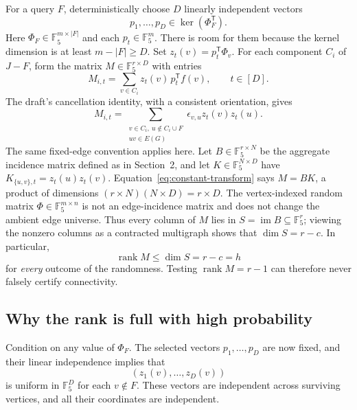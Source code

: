 \documentclass[11pt]{article}
\theoremstyle{remark}\newtheorem{remark}[theorem]{Remark}
\newcommand{\F}{\mathbb F}
\newcommand{\rank}{\operatorname{rank}}
\begin{document}
For a query $F$, deterministically choose $D$ linearly independent vectors
\[
 p_1,\ldots,p_D\in\ker(\Phi_F^{\mathsf T}).
\]
Here $\Phi_F\in\F_5^{m\times|F|}$ and each $p_t\in\F_5^m$. There is room for them because the kernel dimension is at least $m-|F|\ge D$. Set $z_t(v)=p_t^{\mathsf T}\Phi_v$. For each component $C_i$ of $J-F$, form the matrix $M\in\F_5^{r\times D}$ with entries
\[
 M_{i,t}=\sum_{v\in C_i}z_t(v)\,p_t^{\mathsf T}f(v),\qquad t\in[D].
\]
The draft's cancellation identity, with a consistent orientation, gives
\begin{equation}\label{eq:constant-transform}
 M_{i,t}=\sum_{\substack{v\in C_i,\ u\notin C_i\cup F\\uv\in E(G)}}
 \epsilon_{v,u}z_t(v)z_t(u).
\end{equation}
The same fixed-edge convention applies here. Let $B\in\F_5^{r\times N}$ be the aggregate incidence matrix defined as in Section~2, and let $K\in\F_5^{N\times D}$ have $K_{\{u,v\},t}=z_t(u)z_t(v)$. Equation~\eqref{eq:constant-transform} says $M=BK$, a product of dimensions $(r\times N)(N\times D)=r\times D$. The vertex-indexed random matrix $\Phi\in\F_5^{m\times n}$ is not an edge-incidence matrix and does not change the ambient edge universe. Thus every column of $M$ lies in $S=\operatorname{im}B\subseteq\F_5^r$; viewing the nonzero columns as a contracted multigraph shows that $\dim S=r-c$. In particular,
\[
 \rank M\le\dim S=r-c=h
\]
for \emph{every} outcome of the randomness. Testing $\rank M=r-1$ can therefore never falsely certify connectivity.

\subsection{Why the rank is full with high probability}
Condition on any value of $\Phi_F$. The selected vectors $p_1,\ldots,p_D$ are now fixed, and their linear independence implies that
\[
 (z_1(v),\ldots,z_D(v))
\]
is uniform in $\F_5^D$ for each $v\notin F$. These vectors are independent across surviving vertices, and all their coordinates are independent.
\end{document}
